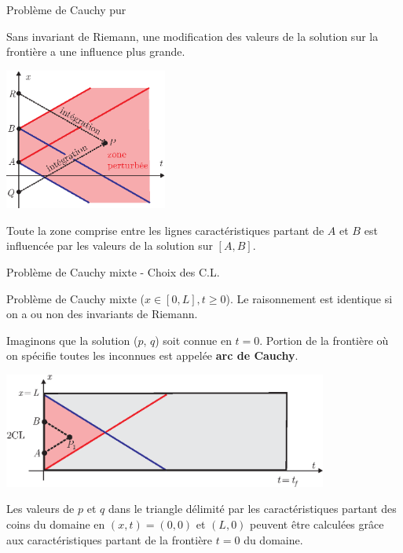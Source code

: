 \documentclass[
mode=present,    %
paper=a4paper,   %
orient=landscape,
display=slides,   %
size=10pt,
style=romain   %
]{powerdot}
\begin{document}
\begin{slide}[toc=]{Problème de Cauchy pur}

Sans invariant de Riemann, une modification des valeurs de la solution sur la frontière a une influence plus grande.

    \centerline{\includegraphics[width=0.4\textwidth]{pertupasriemann.eps} }

\bigskip

Toute la zone comprise entre les lignes caractéristiques partant de $A$ et $B$ est influencée par les valeurs de la solution sur $[A,B]$.

\end{slide}



\begin{slide}[toc=Cauchy mixte / CL]{Problème de Cauchy mixte - Choix des C.L.}

Problème de Cauchy mixte ($x\in[0, L], t\ge0$). Le raisonnement est identique si on a ou non des invariants de Riemann.

\bigskip

Imaginons que la solution ($p$, $q$) soit connue en $t=0$. Portion de la frontière où on spécifie toutes les inconnues est appelée \textbf{arc de Cauchy}.

\bigskip

    \centerline{\includegraphics[width=0.8\textwidth]{mixte2a.eps} }

\bigskip

Les valeurs de $p$ et $q$ dans le triangle délimité par les caractéristiques partant des coins du domaine en $(x,t)=(0,0)$ et $(L,0)$ peuvent être calculées grâce aux caractéristiques partant de la frontière $t=0$ du domaine.


\end{slide}
\end{document}
